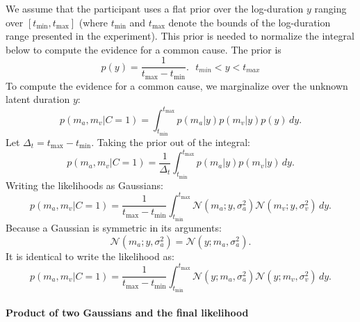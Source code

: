 \documentclass{jov}
\begin{document}
We assume that the participant uses a flat prior over the log-duration $y$ ranging over $[t_{\min}, t_{\max}]$ (where $t_{\min}$ and $t_{\max}$ denote the bounds of the log-duration range presented in the experiment). This prior is needed to normalize the integral below to compute the evidence for a common cause. The prior is
\begin{equation}
p(y) = \frac{1}{t_{\max} - t_{\min}}. 
\text{  } t_{min}<y<t_{max}
\end{equation}
To compute the evidence for a common cause, we marginalize over the unknown latent duration $y$:
\begin{equation}
\label{eq:likelihood_c1_integral}
p(m_a, m_v | C=1) = \int_{t_{\min}}^{t_{\max}} p(m_a | y) p(m_v | y) p(y) \, dy.
\end{equation}
Let $\Delta_t = t_{\max} - t_{\min}$. Taking the prior out of the integral:
\begin{equation}
p(m_a, m_v | C=1)
= \frac{1}{\Delta_t} \int_{t_{\min}}^{t_{\max}} p(m_a | y) p(m_v | y) \, dy.
\end{equation}
Writing the likelihoods as Gaussians:
\begin{equation}
p(m_a, m_v | C=1) = \frac{1}{t_{\max} - t_{\min}} \int_{t_{\min}}^{t_{\max}} \mathcal{N}(m_a; y, \sigma_a^2) \mathcal{N}(m_v; y, \sigma_v^2) \, dy.
\end{equation}
Because a Gaussian is symmetric in its arguments:
\begin{equation}
\mathcal{N}(m_a; y, \sigma_a^2) = \mathcal{N}(y; m_a, \sigma_a^2).
\end{equation}
It is identical to write the likelihood as:
\begin{equation}
p(m_a, m_v | C=1) = \frac{1}{t_{\max} - t_{\min}} \int_{t_{\min}}^{t_{\max}} \mathcal{N}(y; m_a, \sigma_a^2) \mathcal{N}(y; m_v, \sigma_v^2) \, dy.
\end{equation}

\paragraph{Product of two Gaussians and the final likelihood}
\end{document}
